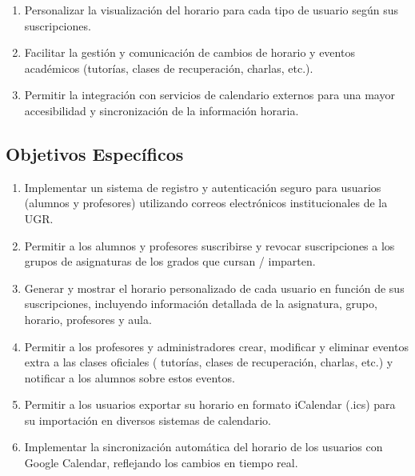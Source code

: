 \begin{enumerate}
    \item Personalizar la visualización del horario para cada tipo de usuario según sus suscripciones.
    \item Facilitar la gestión y comunicación de cambios de horario y eventos académicos (tutorías, clases de recuperación, charlas, etc.).
    \item Permitir la integración con servicios de calendario externos para una mayor accesibilidad y sincronización de la información horaria.
\end{enumerate}

\subsection{Objetivos Específicos}

\begin{enumerate}
    \item Implementar un sistema de registro y autenticación seguro para usuarios (alumnos y profesores) utilizando correos electrónicos institucionales de la UGR.
    \item Permitir a los alumnos y profesores suscribirse y revocar suscripciones a los grupos de asignaturas de los grados que cursan / imparten.
    \item Generar y mostrar el horario personalizado de cada usuario en función de sus suscripciones, incluyendo información detallada de la asignatura, grupo, horario, profesores y aula.
    \item Permitir a los profesores y administradores crear, modificar y eliminar eventos extra a las clases oficiales ( tutorías, clases de recuperación, charlas, etc.) y notificar a los alumnos sobre estos eventos.
    \item Permitir a los usuarios exportar su horario en formato iCalendar (.ics) para su importación en diversos sistemas de calendario.
    \item Implementar la sincronización automática del horario de los usuarios con Google Calendar, reflejando los cambios en tiempo real.
\end{enumerate}
